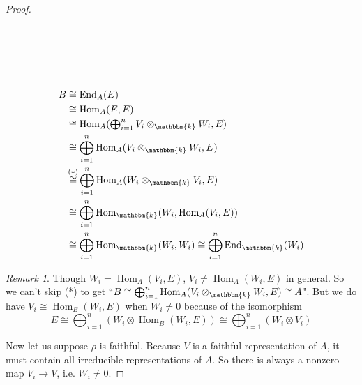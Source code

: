 \documentclass[11pt,oneside]{amsart}
\numberwithin{equation}{section}
\theoremstyle{plain}
\theoremstyle{plain}
\numberwithin{equation}{section}
\theoremstyle{remark}
\newtheorem{remark}[theorem]{Remark}
\newcommand{\Hom}{\operatorname{Hom}}
\newcommand{\End}{\operatorname{End}}
\begin{document}
\begin{proof}
\begin{minipage}[t]{.01\textwidth}
\begin{equation*}
\begin{array}{c||c}
		&	\\
	&\\
	&\\
		&	\\
	&\\
	&\\
		&	\\
	&\\
	&\\
		&	\\
	&\\
	&\\
	\end{array}
	\end{equation*}
\end{minipage}
	\begin{minipage}[t]{.55\textwidth}
	\begin{equation*}
	\begin{aligned}
	&\\[-0.2cm]
	B&\cong \End_A(E)\\
	&\cong \Hom_A(E,E)\\
	&\cong \Hom_A(\textstyle\bigoplus_{i=1}^n V_i \otimes_{\mathbbm{k}}W_i,E)\\
	&\cong \bigoplus_{i=1}^n\Hom_A( V_i \otimes_{\mathbbm{k}}W_i,E)\\
	&\mathop{\cong}\limits^{(*)}\bigoplus_{i=1}^n\Hom_A( W_i \otimes_{\mathbbm{k}}V_i,E)\\
	&\cong\bigoplus_{i=1}^n\Hom_{\mathbbm{k}}( W_i, \Hom_A(V_i,E))\\
	&\cong\bigoplus_{i=1}^n\Hom_{\mathbbm{k}}( W_i, W_i)\cong\bigoplus_{i=1}^n\End_{\mathbbm{k}}(W_i)\\
	\end{aligned}
	\end{equation*}
\end{minipage}

\begin{remark}
	Though $W_i=\Hom_A (V_i,E)$, $V_i\neq\Hom_A (W_i,E)$ in general. So we can't skip (*) to get ``$B\cong \bigoplus_{i=1}^n\Hom_A( V_i \otimes_{\mathbbm{k}}W_i,E) \cong A$". But we do have $V_i \cong \Hom_B(W_i,E)$ when $W_i \neq 0$ because of the isomorphism
	$$E \cong \bigoplus_{i=1}^{n}(W_{i} \otimes \operatorname{Hom}_{B}(W_{i}, E)) \cong \bigoplus_{i=1}^{n}(W_{i} \otimes V_{i})$$
\end{remark}	
Now let us suppose $\rho$ is faithful. Because $V$ is a faithful representation of $A$, it must contain all irreducible representations of $A$. So there is always a nonzero map $V_i \longrightarrow V$, i.e. $W_i \neq 0$.


\end{proof}
\end{document}
